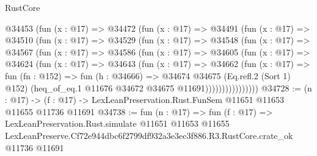 \begin{lexlean}{RustCore}
\begin{coremodule}
        @34453
          (fun (x : @17) =>
          @34472
            (fun (x : @17) =>
            @34491
              (fun (x : @17) =>
              @34510
                (fun (x : @17) =>
                @34529
                  (fun (x : @17) =>
                  @34548
                    (fun (x : @17) =>
                    @34567
                      (fun (x : @17) =>
                      @34586
                        (fun (x : @17) =>
                        @34605
                          (fun (x : @17) =>
                          @34624
                            (fun (x : @17) =>
                            @34643
                              (fun (x : @17) =>
                              @34662
                                (fun (x : @17) =>
                                fun (fn : @152) =>
                                fun (h : @34666) =>
                                @34674
                                  @34675
                                  (Eq.refl.{2} (Sort 1) @152)
                                  (heq_of_eq.{1} @11676 @34672 @34675 @11691))))))))))))))))
@34728 := (n : @17) ->
  (f : @17) -> LexLeanPreservation.Rust.FunSem @11651 @11653 @11655 @11736 @11691
@34738 := fun (n : @17) =>
  fun (f : @17) =>
  LexLeanPreservation.Rust.simulate
    @11651
    @11653
    @11655
    LexLeanPreserve.Cf72e944dbc6f2799df932a3e3ec3f886.R3.RustCore.crate_ok
    @11736
    @11691
\end{coremodule}
\end{lexlean}
